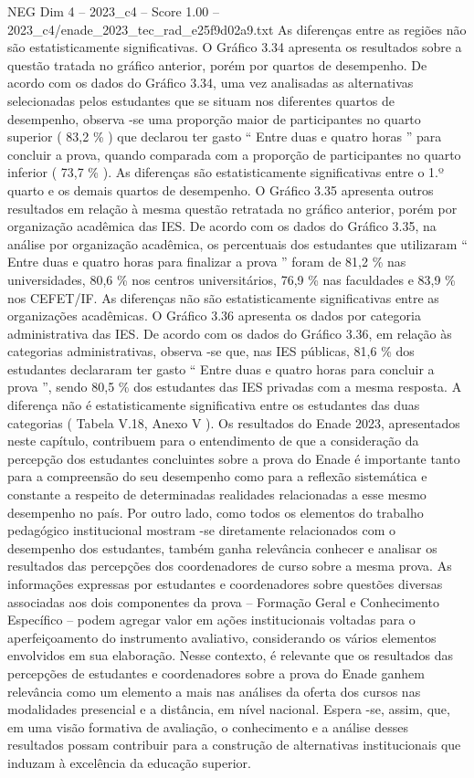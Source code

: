 \begin{textsample}{NEG Dim 4 – 2023\_c4 – Score 1.00 – 2023\_c4/enade\_2023\_tec\_rad\_e25f9d02a9.txt}
As diferenças entre as regiões não são estatisticamente significativas.
O Gráfico 3.34 apresenta os resultados sobre a questão tratada no gráfico anterior, porém por quartos de desempenho.
De acordo com os dados do Gráfico 3.34, uma vez analisadas as alternativas selecionadas pelos estudantes que se situam nos diferentes quartos de desempenho, observa -se uma proporção maior de participantes no quarto superior ( 83,2 \% ) que declarou ter gasto “ Entre duas e quatro horas ” para concluir a prova, quando comparada com a proporção de participantes no quarto inferior ( 73,7 \% ).
As diferenças são estatisticamente significativas entre o 1.º quarto e os demais quartos de desempenho.
O Gráfico 3.35 apresenta outros resultados em relação à mesma questão retratada no gráfico anterior, porém por organização acadêmica das IES.
De acordo com os dados do Gráfico 3.35, na análise por organização acadêmica, os percentuais dos estudantes que utilizaram “ Entre duas e quatro horas para finalizar a prova ” foram de 81,2 \% nas universidades, 80,6 \% nos centros universitários, 76,9 \% nas faculdades e 83,9 \% nos CEFET/IF.
As diferenças não são estatisticamente significativas entre as organizações acadêmicas.
O Gráfico 3.36 apresenta os dados por categoria administrativa das IES.
De acordo com os dados do Gráfico 3.36, em relação às categorias administrativas, observa -se que, nas IES públicas, 81,6 \% dos estudantes declararam ter gasto “ Entre duas e quatro horas para concluir a prova ”, sendo 80,5 \% dos estudantes das IES privadas com a mesma resposta.
A diferença não é estatisticamente significativa entre os estudantes das duas categorias ( Tabela V.18, Anexo V ).
Os resultados do Enade 2023, apresentados neste capítulo, contribuem para o entendimento de que a consideração da percepção dos estudantes concluintes sobre a prova do Enade é importante tanto para a compreensão do seu desempenho como para a reflexão sistemática e constante a respeito de determinadas realidades relacionadas a esse mesmo desempenho no país.
Por outro lado, como todos os elementos do trabalho pedagógico institucional mostram -se diretamente relacionados com o desempenho dos estudantes, também ganha relevância conhecer e analisar os resultados das percepções dos coordenadores de curso sobre a mesma prova.
As informações expressas por estudantes e coordenadores sobre questões diversas associadas aos dois componentes da prova – Formação Geral e Conhecimento Específico – podem agregar valor em ações institucionais voltadas para o aperfeiçoamento do instrumento avaliativo, considerando os vários elementos envolvidos em sua elaboração.
Nesse contexto, é relevante que os resultados das percepções de estudantes e coordenadores sobre a prova do Enade ganhem relevância como um elemento a mais nas análises da oferta dos cursos nas modalidades presencial e a distância, em nível nacional.
Espera -se, assim, que, em uma visão formativa de avaliação, o conhecimento e a análise desses resultados possam contribuir para a construção de alternativas institucionais que induzam à excelência da educação superior.

\end{textsample}
